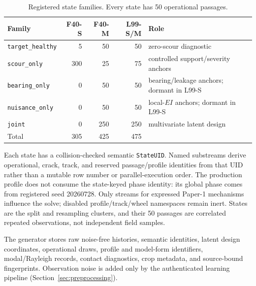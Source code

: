 \begin{table}[htbp]
\centering
\caption{Registered state families. Every state has 50 operational passages.}
\label{tab:families}
\small
\begin{tabular}{lrrrp{5.0cm}}
\toprule
Family & F40-S & F40-M & L99-S/M & Role \\
\midrule
\texttt{target\_healthy} & 5 & 50 & 50 & zero-scour diagnostic \\
\texttt{scour\_only} & 300 & 25 & 75 & controlled support/severity anchors \\
\texttt{bearing\_only} & 0 & 50 & 50 & bearing/leakage anchors; dormant in L99-S \\
\texttt{nuisance\_only} & 0 & 50 & 50 & local-$EI$ anchors; dormant in L99-S \\
\texttt{joint} & 0 & 250 & 250 & multivariate latent design \\
\midrule
Total & 305 & 425 & 475 & \\
\bottomrule
\end{tabular}
\end{table}

Each state has a collision-checked semantic \texttt{StateUID}. Named substreams
derive operational, crack, track, and reserved passage/profile identities from
that UID rather than a mutable row number or parallel-execution order. The
production profile does not consume the state-keyed phase identity: its global
phase comes from registered seed 20260728. Only streams for expressed Paper-1
mechanisms influence the solve; disabled profile/track/wheel namespaces remain
inert. States are the split and resampling clusters, and their 50 passages are
correlated repeated observations, not independent field samples.

The generator stores raw noise-free histories, semantic identities, latent
design coordinates, operational draws, profile and model-form identifiers,
modal/Rayleigh records, contact diagnostics, crop metadata, and source-bound
fingerprints. Observation noise is added only by the authenticated learning
pipeline (Section~\ref{sec:preprocessing}).
